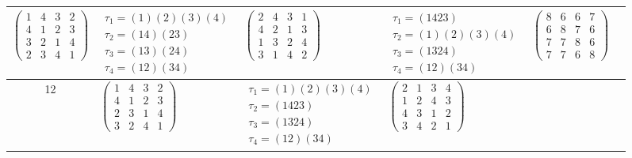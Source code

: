 \begin{longtable}{|c|p{2.7cm}|p{2.7cm}|p{2.7cm}|p{2.7cm}|p{2.7cm}|}
    $\begin{pmatrix} 1 & 4 & 3 & 2 \\ 4 & 1 & 2 & 3 \\ 3 & 2 & 1 & 4 \\ 2 & 3 & 4 & 1 \end{pmatrix}$               &
    $\begin{array}{l}\tau_{1}=(1)(2)(3)(4)\\ \tau_{2}=(14)(23)\\ \tau_{3}=(13)(24)\\ \tau_{4}=(12)(34)\end{array}$ &
    $\begin{pmatrix} 2 & 4 & 3 & 1 \\ 4 & 2 & 1 & 3 \\ 1 & 3 & 2 & 4 \\ 3 & 1 & 4 & 2 \end{pmatrix}$               &
    $\begin{array}{l}\tau_{1}=(1423)\\ \tau_{2}=(1)(2)(3)(4)\\ \tau_{3}=(1324)\\ \tau_{4}=(12)(34)\end{array}$     &
    $\begin{pmatrix} 8 & 6 & 6 & 7 \\ 6 & 8 & 7 & 6 \\ 7 & 7 & 8 & 6 \\ 7 & 7 & 6 & 8 \end{pmatrix}$                                                                                           \\
    \hline
    12                                                                                                             &
    $\begin{pmatrix} 1 & 4 & 3 & 2 \\ 4 & 1 & 2 & 3 \\ 2 & 3 & 1 & 4 \\ 3 & 2 & 4 & 1 \end{pmatrix}$               &
    $\begin{array}{l}\tau_{1}=(1)(2)(3)(4)\\ \tau_{2}=(1423)\\ \tau_{3}=(1324)\\ \tau_{4}=(12)(34)\end{array}$     &
    $\begin{pmatrix} 2 & 1 & 3 & 4 \\ 1 & 2 & 4 & 3 \\ 4 & 3 & 1 & 2 \\ 3 & 4 & 2 & 1 \end{pmatrix}$               &

\end{longtable}
